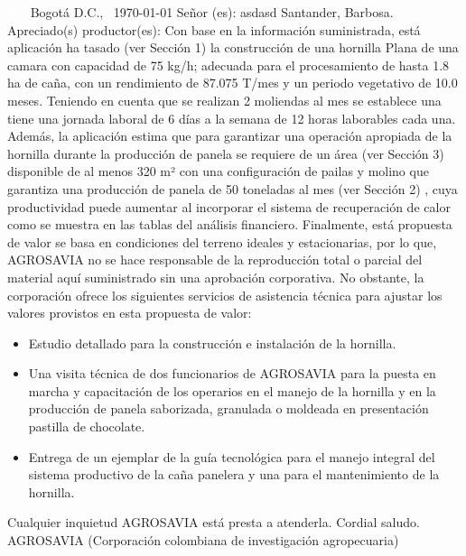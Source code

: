 \documentclass{article}%
\begin{document}
\begin{large}%
\textcolor{white}{ 
HH
}%
\linebreak%
Bogotá D.C., %
\ {\today}%
\newline%
 \newline%
%
\linebreak%
\newline%
Señor (es):%
\newline%
asdasd%
\newline%
Santander, Barbosa.%
\newline%
 \newline%
%
\newline%
Apreciado(s) productor(es):%
\newline%
 \newline%
%
Con base en la información suministrada, está aplicación ha tasado (ver Sección 1) la construcción de una hornilla Plana de una camara con capacidad de 75 kg/h; adecuada para el procesamiento de hasta 1.8 ha de caña, con un rendimiento de 87.075 T/mes y un periodo vegetativo de 10.0 meses. Teniendo en cuenta que se realizan 2 moliendas al mes se establece una tiene una jornada laboral de 6 días a la semana de 12 horas laborables cada una. \newline%
 Además, la aplicación estima que para garantizar una operación apropiada de la hornilla durante la producción de panela se requiere de un área (ver Sección 3) disponible de al menos 320 m² con una configuración de pailas y molino que garantiza una producción de panela de 50 toneladas al mes (ver Sección 2)%
, cuya productividad puede aumentar al incorporar el sistema de recuperación de calor como se muestra en las tablas del análisis financiero.%
\newline%
 Finalmente, está propuesta de valor se basa en condiciones del terreno ideales y estacionarias, por lo que, AGROSAVIA no se hace responsable de la reproducción total o parcial del material aquí suministrado sin una aprobación corporativa. No obstante, la corporación ofrece los siguientes servicios de asistencia técnica para ajustar los valores provistos en esta propuesta de valor:%
\begin{itemize}%
\item%
Estudio detallado para la construcción e instalación de la hornilla.%
\item%
Una visita técnica de dos funcionarios de AGROSAVIA para la puesta en marcha y capacitación de los operarios en el manejo de la hornilla y en la producción de panela saborizada, granulada o moldeada en presentación pastilla de chocolate.%
\item%
Entrega de un ejemplar de la guía tecnológica para el manejo integral del sistema productivo de la caña panelera y una para el mantenimiento de la hornilla.%
\end{itemize}%
Cualquier inquietud AGROSAVIA está presta a atenderla.\newline%
Cordial saludo.\newline%
\newline%
 \newline%
 \newline%
 \newline%
AGROSAVIA (Corporación colombiana de investigación agropecuaria)%
\end{large}%
\end{document}
